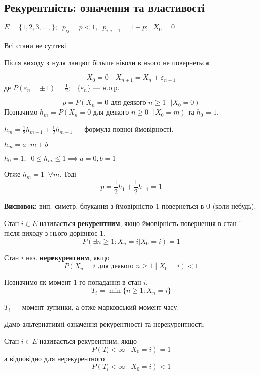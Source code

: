 \subsection{Рекурентність: означення та властивості}
\begin{example}
  $E = \{1, 2, 3, \ldots,\} ; \;\; p_{ij} = p < 1,\;\; p_{i, i+1} = 1-p; \;\; X_0 = 0$

  Всі стани не суттєві

  Після виходу з нуля ланцюг більше ніколи в нього не повернеться.
\end{example}
\begin{example}
  \[ X_0 = 0 \quad X_{n+1}= X_n + \varepsilon_{n+1} \]
  де $P\left( \varepsilon_n = \pm 1 \right) =\frac{1}{2}; \;\;\; \{\varepsilon_{n}\} $ --- н.о.р.

  \[ p = P\left( X_n = 0 \text{ для деякого $n \geq 1$ } | X_0 = 0 \right)  \] 
  Позначимо $h_m = P\left( X_n = 0 \text{ для деякого $n \geq 0$ } | X_0 = m \right)$ та
  $h_0 = 1$.

  $h_{m}=\frac{1}{2} h_{m+1} + \frac{1}{2} h_{m-1}$ --- формула повної ймовірності.

  $h_m = a \cdot m + b$

  $h_0 = 1, \;\; 0 \leq h_m \leq 1 \implies a = 0, b = 1$

  Отже $h_m = 1 \;\; \forall m$. Тоді \[ p = \frac{1}{2}h_1 + \frac{1}{2}h_{-1} = 1 \] 

  \textbf{Висновок:} вип. симетр. блукання з ймовірністю 1 повернеться  в 0 (коли-небудь).
\end{example}

\begin{definition}
  Стан $i \in E$ називається \textbf{рекурентним}, якщо ймовірність повернення 
  в стан i після виходу з нього дорівнює 1.
  \[ P\left( \exists n \geq 1 : X_{n} = i | X_0 = i \right) = 1 \] 

  Стан $i$ наз. \textbf{нерекурентним}, якщо
  \[ P\left( X_{n} = i \text{ для деякого } n \geq 1 \mid X_0 = i \right) < 1 \] 
\end{definition}

Позначимо як момент 1-го попадання в стан $i$.
\[ T_i = \min \{ n \geq 1 : X_n = i \}  \] 

\begin{remark}
  $T_i$ --- момент зупинки, а отже марковський момент часу.
\end{remark}

Дамо альтернативні означення рекурентності та нерекурентності:
\begin{definition}
  Стан $i \in E$ називається рекурентним, якщо
  \[ P\left( T_i < \infty \mid  X_0 = i \right) = 1 \] 
  а відповідно для нерекурентного
  \[ P\left( T_i < \infty \mid  X_0 = i \right) < 1 \] 
\end{definition}

